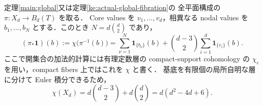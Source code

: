 \begin{proposition}
\label{inv:euler-pushforward}
定理\ref{main:global}又は定理\ref{ke:actual-global-fibration}の
全平面構成の $\pi:X_d\to B_d(T)$ を取る．
Core values を $v_1,\ldots,v_d$，相異なる nodal values を
$b_1,\ldots,b_N$ とする．このとき $N=d\binom d2$ であり，
\begin{equation}\label{inv:eq:euler-pushforward}
 (\pi_*\mathbf1)(b):=\chi\bigl(\pi^{-1}(b)\bigr)
 =\sum_{\nu=1}^{N}\mathbf1_{\{b_\nu\}}(b)
  +\binom{d-3}{2}\sum_{i=1}^d\mathbf1_{\{v_i\}}(b).
\end{equation}
ここで開集合の加法的計算には有理定数層の compact-support cohomology の
$\chi_c$ を用い，compact fibers 上ではこれを $\chi$ と書く．
基底を有限個の局所自明な層に分けて Euler 積分できるため，
\begin{equation}\label{inv:euler}
\chi(X_d)=d\binom{d-3}{2}+d\binom d2=d(d^2-4d+6).
\end{equation}
\end{proposition}
